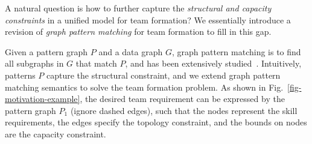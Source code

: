 
A natural question is how to further capture the {\em structural and capacity constraints} in a unified model for team formation?
We essentially introduce a revision of {\em graph pattern matching} for team formation to fill in this gap.

Given a pattern graph $P$ and a data graph $G$, graph pattern matching is to find all subgraphs in $G$ that match $P$, and has been extensively studied~\cite{Ullmann76,infsimu95,FanLMTWW10,MaCFHW14,Guanfeng15,FanCount16}.  Intuitively, patterns $P$ capture the structural constraint, and we extend graph pattern matching semantics to solve the team formation problem. As shown in Fig.~\ref{fig-motivation-example},  the desired team requirement can be expressed by the pattern graph $P_1$ (ignore dashed edges), such that the nodes represent the skill requirements, the edges specify the topology constraint, and the bounds on nodes are the capacity constraint.


